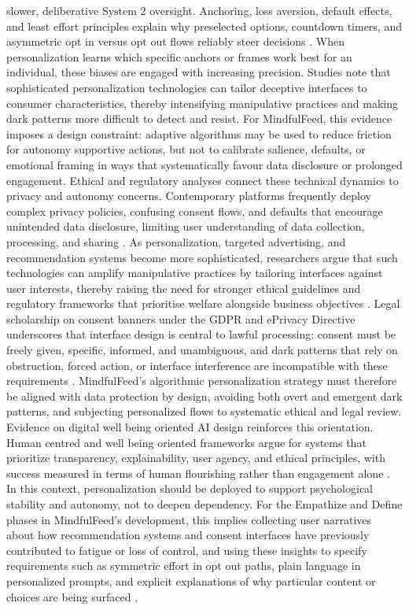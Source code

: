 \documentclass{article}
\begin{document}
slower, deliberative $ \text{System 2} $ oversight. Anchoring, loss aversion, default effects, and least effort principles explain why preselected options, countdown timers, and asymmetric opt in versus opt out flows reliably steer decisions \parencites[2]{4807303}. When personalization learns which specific anchors or frames work best for an individual, these biases are engaged with increasing precision. Studies note that sophisticated personalization technologies can tailor deceptive interfaces to consumer characteristics, thereby intensifying manipulative practices and making dark patterns more difficult to detect and resist. For MindfulFeed, this evidence imposes a design constraint: adaptive algorithms may be used to reduce friction for autonomy supportive actions, but not to calibrate salience, defaults, or emotional framing in ways that systematically favour data disclosure or prolonged engagement. Ethical and regulatory analyses connect these technical dynamics to privacy and autonomy concerns. Contemporary platforms frequently deploy complex privacy policies, confusing consent flows, and defaults that encourage unintended data disclosure, limiting user understanding of data collection, processing, and sharing \parencites[3]{2668071}. As personalization, targeted advertising, and recommendation systems become more sophisticated, researchers argue that such technologies can amplify manipulative practices by tailoring interfaces against user interests, thereby raising the need for stronger ethical guidelines and regulatory frameworks that prioritise welfare alongside business objectives \parencites[3]{2668071}[7]{9300898}. Legal scholarship on consent banners under the GDPR and ePrivacy Directive underscores that interface design is central to lawful processing: consent must be freely given, specific, informed, and unambiguous, and dark patterns that rely on obstruction, forced action, or interface interference are incompatible with these requirements \parencites[4]{5678011}. MindfulFeed's algorithmic personalization strategy must therefore be aligned with data protection by design, avoiding both overt and emergent dark patterns, and subjecting personalized flows to systematic ethical and legal review. Evidence on digital well being oriented AI design reinforces this orientation. Human centred and well being oriented frameworks argue for systems that prioritize transparency, explainability, user agency, and ethical principles, with success measured in terms of human flourishing rather than engagement alone \parencites[5]{9300898}[7]{9300898}. In this context, personalization should be deployed to support psychological stability and autonomy, not to deepen dependency. For the Empathize and Define phases in MindfulFeed's development, this implies collecting user narratives about how recommendation systems and consent interfaces have previously contributed to fatigue or loss of control, and using these insights to specify requirements such as symmetric effort in opt out paths, plain language in personalized prompts, and explicit explanations of why particular content or choices are being surfaced \parencites[2]{4807303}[3]{2668071}[4]{5678011}.
\end{document}
